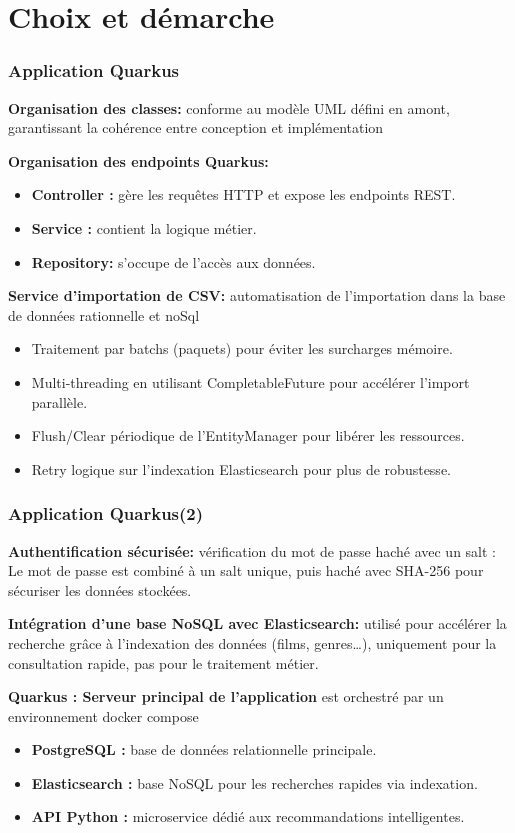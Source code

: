 \documentclass{beamer}
\begin{document}
    \section{Choix et démarche}
    \begin{frame}
        \scriptsize
        \frametitle{Application Quarkus}
        \textbf{Organisation des classes: }conforme au modèle UML défini en amont, garantissant la cohérence entre conception et implémentation


        \textbf{Organisation des endpoints Quarkus:}
        \begin{itemize}
            \item \textbf{Controller :}  gère les requêtes HTTP et expose les endpoints REST.
            \item \textbf{Service : }contient la logique métier.
            \item \textbf{Repository: } s'occupe de l'accès aux données.
        \end{itemize}

        \textbf{Service d'importation de CSV: }automatisation de l'importation dans la base de données rationnelle et noSql
        \begin{itemize}
            \item Traitement par batchs (paquets) pour éviter les surcharges mémoire.
            \item Multi-threading en utilisant CompletableFuture pour accélérer l'import parallèle.
            \item Flush/Clear périodique de l’EntityManager pour libérer les ressources.
            \item Retry logique sur l’indexation Elasticsearch pour plus de robustesse.
        \end{itemize}
    \end{frame}

    \begin{frame}
        \scriptsize
        \frametitle{Application Quarkus(2)}
        \textbf{Authentification sécurisée: }vérification du mot de passe haché avec un salt : Le mot de passe est combiné à un salt unique, puis haché avec SHA-256 pour sécuriser les données stockées.

        \textbf{Intégration d’une base NoSQL avec Elasticsearch: } utilisé pour accélérer la recherche grâce à l’indexation des données (films, genres…), uniquement pour la consultation rapide, pas pour le traitement métier.

        \textbf{Quarkus : Serveur principal de l’application} est orchestré par un environnement docker compose
        \begin{itemize}
            \item \textbf{PostgreSQL :} base de données relationnelle principale.
            \item \textbf{Elasticsearch :} base NoSQL pour les recherches rapides via indexation.
            \item \textbf{API Python :} microservice dédié aux recommandations intelligentes.
        \end{itemize}
    \end{frame}
\end{document}
